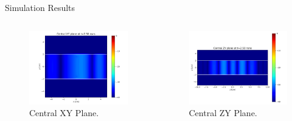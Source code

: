 \documentclass[aspectratio=169]{beamer}
\begin{document}
\begin{frame}{Simulation Results}

  \begin{columns}
    
    \begin{column}{0.5\textwidth}
      
      \begin{figure}[H]
        \centering
        \includegraphics[width=\textwidth]{../contents/central_xy_plane.png}
        \caption{Central XY Plane.}
      \end{figure}

    \end{column}

    \begin{column}{0.5\textwidth}
      
      \begin{figure}[H]
        \centering
        \includegraphics[width=\textwidth]{../contents/central_zy_plane.png}
        \caption{Central ZY Plane.}
      \end{figure}

    \end{column}

  \end{columns}

\end{frame}
\end{document}
